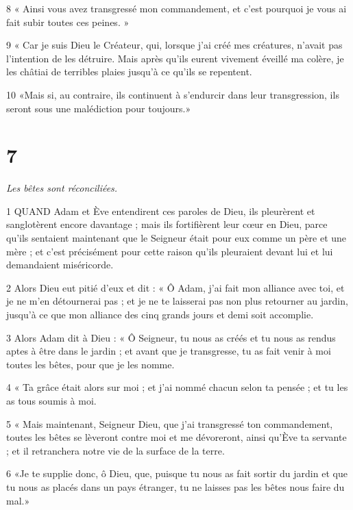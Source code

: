 \par 8 « Ainsi vous avez transgressé mon commandement, et c'est pourquoi je vous ai fait subir toutes ces peines. »

\par 9 « Car je suis Dieu le Créateur, qui, lorsque j'ai créé mes créatures, n'avait pas l'intention de les détruire. Mais après qu'ils eurent vivement éveillé ma colère, je les châtiai de terribles plaies jusqu'à ce qu'ils se repentent.

\par 10 «Mais si, au contraire, ils continuent à s'endurcir dans leur transgression, ils seront sous une malédiction pour toujours.»

\chapter{7}

\par \textit{Les bêtes sont réconciliées.}

\par 1 QUAND Adam et Ève entendirent ces paroles de Dieu, ils pleurèrent et sanglotèrent encore davantage ; mais ils fortifièrent leur cœur en Dieu, parce qu'ils sentaient maintenant que le Seigneur était pour eux comme un père et une mère ; et c’est précisément pour cette raison qu’ils pleuraient devant lui et lui demandaient miséricorde.

\par 2 Alors Dieu eut pitié d'eux et dit : « Ô Adam, j'ai fait mon alliance avec toi, et je ne m'en détournerai pas ; et je ne te laisserai pas non plus retourner au jardin, jusqu'à ce que mon alliance des cinq grands jours et demi soit accomplie.

\par 3 Alors Adam dit à Dieu : « Ô Seigneur, tu nous as créés et tu nous as rendus aptes à être dans le jardin ; et avant que je transgresse, tu as fait venir à moi toutes les bêtes, pour que je les nomme.

\par 4 « Ta grâce était alors sur moi ; et j'ai nommé chacun selon ta pensée ; et tu les as tous soumis à moi.

\par 5 « Mais maintenant, Seigneur Dieu, que j'ai transgressé ton commandement, toutes les bêtes se lèveront contre moi et me dévoreront, ainsi qu'Ève ta servante ; et il retranchera notre vie de la surface de la terre.

\par 6 «Je te supplie donc, ô Dieu, que, puisque tu nous as fait sortir du jardin et que tu nous as placés dans un pays étranger, tu ne laisses pas les bêtes nous faire du mal.»

